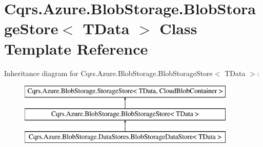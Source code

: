 \hypertarget{classCqrs_1_1Azure_1_1BlobStorage_1_1BlobStorageStore}{}\section{Cqrs.\+Azure.\+Blob\+Storage.\+Blob\+Storage\+Store$<$ T\+Data $>$ Class Template Reference}
\label{classCqrs_1_1Azure_1_1BlobStorage_1_1BlobStorageStore}
Inheritance diagram for Cqrs.\+Azure.\+Blob\+Storage.\+Blob\+Storage\+Store$<$ T\+Data $>$\+:\begin{figure}[H]
\begin{center}
\leavevmode
\includegraphics[height=3.000000cm]{classCqrs_1_1Azure_1_1BlobStorage_1_1BlobStorageStore}
\end{center}
\end{figure}

